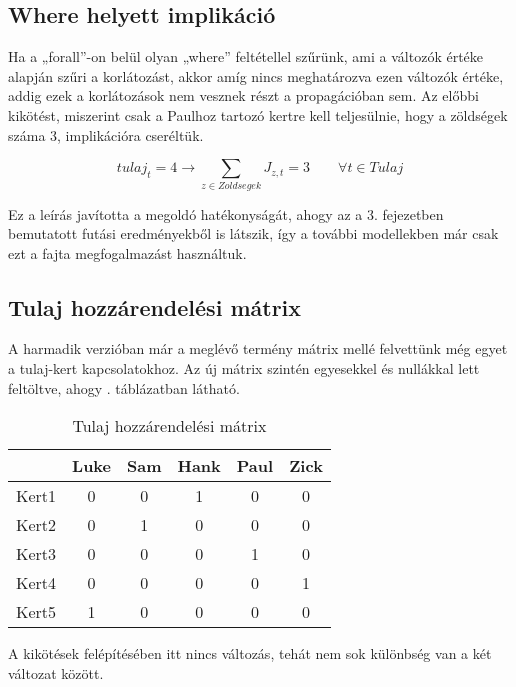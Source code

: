 \documentclass[12pt,a4paper]{report}
\begin{document}
\subsection{Where helyett implikáció}

    Ha a „forall”-on belül olyan „where” feltétellel szűrünk, ami a változók értéke alapján szűri a korlátozást, akkor amíg nincs meghatározva ezen változók értéke, addig ezek a korlátozások nem vesznek részt a propagációban sem.
    Az előbbi kikötést, miszerint csak a Paulhoz tartozó kertre kell teljesülnie, hogy a zöldségek száma 3, implikációra cseréltük.

    \begin{equation}
    tulaj_t=4 \rightarrow \sum_{z\in Zoldsegek} J_{z,t} =3 \qquad \forall t\in Tulaj
    \end{equation}

    Ez a leírás javította a megoldó hatékonyságát, ahogy az a 3. fejezetben bemutatott futási eredményekből is látszik, így a további modellekben már csak ezt a fajta megfogalmazást 
    használtuk.


\subsection{Tulaj hozzárendelési mátrix}

    A harmadik verzióban már a meglévő termény mátrix mellé felvettünk még egyet a tulaj-kert kapcsolatokhoz.
    Az új mátrix szintén egyesekkel és nullákkal lett feltöltve, ahogy . táblázatban látható.
	
	\begin{table}[ht!]
		\centering
		\caption{Tulaj hozzárendelési mátrix}
        \label{tulaj_matrix}
		\begin{tabular}{|c|c|c|c|c|c|}
			\hline 
			& Luke & Sam & Hank & Paul & Zick \\ 
			\hline 
			Kert1 & 0 & 0 & 1 & 0 & 0 \\ 
			\hline 
			Kert2 & 0 & 1 & 0 & 0 & 0 \\ 
			\hline 
			Kert3 & 0 & 0 & 0 & 1 & 0 \\ 
			\hline 
			Kert4 & 0 & 0 & 0 & 0 & 1 \\ 
			\hline 
			Kert5 & 1 & 0 & 0 & 0 & 0 \\ 
			\hline 
		\end{tabular}
	\end{table}
     

    A kikötések felépítésében itt nincs változás, tehát nem sok különbség van a két változat között.
\end{document}
